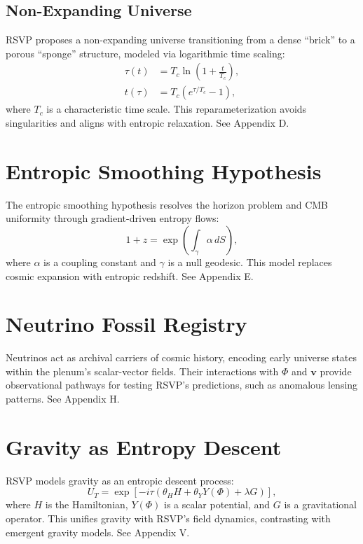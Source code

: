 \documentclass[12pt]{report}
\newcommand{\PhiRSVP}{\Phi}
\newcommand{\vRSVP}{\mathbf{v}}
\newcommand{\SRSVP}{S}
\begin{document}
\section{Non-Expanding Universe}
RSVP proposes a non-expanding universe transitioning from a dense “brick” to a porous “sponge” structure, modeled via logarithmic time scaling:
\begin{align}
\tau(t) &= T_c \ln\left(1 + \frac{t}{T_c}\right), \label{eq:tau} \\
t(\tau) &= T_c \left(e^{\tau / T_c} - 1\right), \label{eq:t}
\end{align}
where \(T_c\) is a characteristic time scale. This reparameterization avoids singularities and aligns with entropic relaxation. See Appendix D.

\chapter{Entropic Smoothing Hypothesis}
The entropic smoothing hypothesis resolves the horizon problem and CMB uniformity through gradient-driven entropy flows:
\begin{equation}
1 + z = \exp\left(\int_\gamma \alpha \, d\SRSVP\right), \label{eq:redshift}
\end{equation}
where \(\alpha\) is a coupling constant and \(\gamma\) is a null geodesic. This model replaces cosmic expansion with entropic redshift. See Appendix E.

\chapter{Neutrino Fossil Registry}
Neutrinos act as archival carriers of cosmic history, encoding early universe states within the plenum’s scalar-vector fields. Their interactions with \(\PhiRSVP\) and \(\vRSVP\) provide observational pathways for testing RSVP’s predictions, such as anomalous lensing patterns. See Appendix H.

\chapter{Gravity as Entropy Descent}
RSVP models gravity as an entropic descent process:
\begin{equation}
U_T = \exp\left[-i \tau \left(\theta_H H + \theta_Y Y(\PhiRSVP) + \lambda G\right)\right], \label{eq:unified}
\end{equation}
where \(H\) is the Hamiltonian, \(Y(\PhiRSVP)\) is a scalar potential, and \(G\) is a gravitational operator. This unifies gravity with RSVP’s field dynamics, contrasting with emergent gravity models. See Appendix V.
\end{document}
